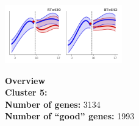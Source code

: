 \begin{multicols}{2}
\includegraphics[width=2in]{figures/clusters/root_Postflowering_4.png}
\columnbreak

\noindent \textbf{Overview}\\\textbf{Cluster 5:}  \\
\textbf{Number of genes:} 3134 \\
\textbf{Number of ``good'' genes:} 1993 \\
\end{multicols}

